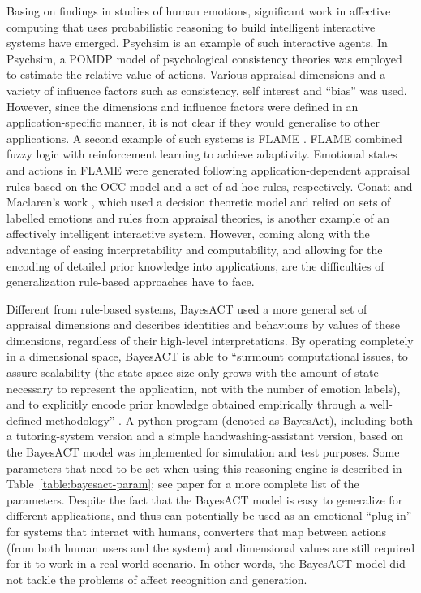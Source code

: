 Basing on findings in studies of human emotions, significant work in affective computing that uses probabilistic reasoning to build intelligent interactive systems have emerged. Psychsim \cite{pynadath2005psychsim} is an example of such interactive agents. In Psychsim, a POMDP model of psychological consistency theories was employed to estimate the relative value of actions. Various appraisal dimensions and a variety of influence factors such as consistency, self interest and ``bias'' was used. However, since the dimensions and influence factors were defined in an application-specific manner, it is not clear if they would generalise to other applications. A second example of such systems is FLAME \cite{el2000flame}. FLAME combined fuzzy logic with reinforcement learning to achieve adaptivity. Emotional states and actions in FLAME were generated following application-dependent appraisal rules based on the OCC model \cite{ortony1990cognitive} and a set of ad-hoc rules, respectively. Conati and Maclaren's work \cite{conati2009empirically}, which used a decision theoretic model and relied on sets of labelled emotions and rules from appraisal theories, is another example of an affectively intelligent interactive system. However, coming along with the advantage of easing interpretability and computability, and allowing for the encoding of detailed prior knowledge into applications, are the difficulties of generalization rule-based approaches have to face.

Different from rule-based systems, BayesACT \cite{hoey2013bayesian} used a more general set of appraisal dimensions and describes identities and behaviours by values of these dimensions, regardless of their high-level interpretations. By operating completely in a dimensional space, BayesACT is able to ``surmount computational issues, to assure scalability (the state space size only grows with the amount of state necessary to represent the application, not with the number of emotion labels), and to explicitly encode prior knowledge obtained empirically through a well-defined methodology'' \cite{hoey2013bayesian}. A python program (denoted as BayesAct), including both a tutoring-system version and a simple handwashing-assistant version, based on the BayesACT model was implemented for simulation and test purposes. Some parameters that need to be set when using this reasoning engine is described in Table~\ref{table:bayesact-param}; see paper \cite{hoey2013bayesian} for a more complete list of the parameters. Despite the fact that the BayesACT model is easy to generalize for different applications, and thus can potentially be used as an emotional ``plug-in'' for systems that interact with humans, converters that map between actions (from both human users and the system) and dimensional values are still required for it to work in a real-world scenario. In other words, the BayesACT model did not tackle the problems of affect recognition and generation.


